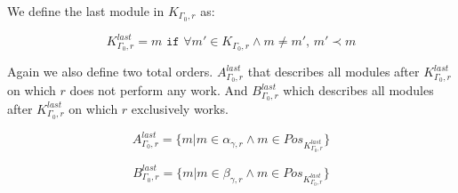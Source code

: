 We define the last module in $K_{\Gamma_0 ,r}$ as:

\[K_{\Gamma_0 ,r}^{last} = m \texttt{ if } \forall m' \in K_{\Gamma_0 ,r} \land m \neq m',\, m' \prec m \] 


Again we also define two total orders. $A_{\Gamma_0 ,r}^{last}$ that describes all modules after $K_{\Gamma_0 ,r}^{last}$ on which $r$ does not perform any work. And $B_{\Gamma_0 ,r}^{last}$ which describes all modules after $K_{\Gamma_0 ,r}^{last}$ on which $r$ exclusively works.


\[ A_{\Gamma_0 ,r}^{last} = \{m | m \in \alpha_{\gamma ,r}  \land m \in Pos_{K_{\Gamma_0 ,r}^{last}} \} \]

\[B_{\Gamma_0 ,r}^{last} = \{m | m \in \beta_{\gamma ,r}  \land m \in Pos_{K_{\Gamma_0 ,r}^{last}} \}\]






